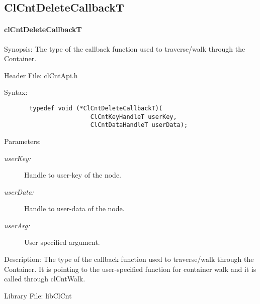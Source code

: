 \newpage
\subsection{ClCntDeleteCallbackT}
\hypertarget{pagecnt119}{}\paragraph{cl\-Cnt\-Delete\-CallbackT}\label{pagecnt119}
\begin{Desc}
\item[Synopsis:]The type of the callback function used to traverse/walk through the Container.
\end{Desc}
\begin{Desc}
\item[Header File:]clCntApi.h\end{Desc}
\begin{Desc}
\item[Syntax:]

\footnotesize\begin{verbatim}   	typedef void (*ClCntDeleteCallbackT)(
						ClCntKeyHandleT userKey,
						ClCntDataHandleT userData);
\end{verbatim}
\normalsize
\end{Desc}
\begin{Desc}
\item[Parameters:]
\begin{description}
\item[{\em userKey:}] Handle to user-key of the node.
\item[{\em userData:}] Handle to user-data of the node. 
\item[{\em userArg:}] User specified argument.
\end{description}
\end{Desc}
\begin{Desc}
\item[Description:]
The type of the callback function used to traverse/walk through the Container. It is pointing to the user-specified function for container walk and it
is called through clCntWalk.\end{Desc}
\begin{Desc}
\item[Library File:]lib\-Cl\-Cnt\end{Desc}